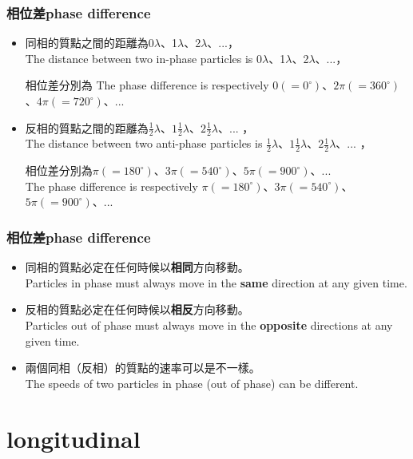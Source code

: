 \documentclass[beamer=true]{standalone}
\begin{document}
\begin{frame}
    \frametitle{相位差phase difference}
    \begin{itemize}
        \item 同相的質點之間的距離為0$\lambda$、1$\lambda$、2$\lambda$、...，\\The distance between two in-phase particles is  0$\lambda$、1$\lambda$、2$\lambda$、...，\par 相位差分別為 The phase difference is respectively $0(=0^\circ)$、$2\pi(=360^\circ)$、$4\pi(=720^\circ)$、...
        \item 反相的質點之間的距離為$\frac{1}{2}\lambda$、$1\frac{1}{2}\lambda$、$2\frac{1}{2}\lambda$、... ，\\The distance between two anti-phase particles is $\frac{1}{2}\lambda$、$1\frac{1}{2}\lambda$、$2\frac{1}{2}\lambda$、... ，\par 相位差分別為$\pi(=180^\circ)$、$3\pi(=540^\circ)$、$5\pi(=900^\circ)$、...\\The phase difference is respectively $\pi(=180^\circ)$、$3\pi(=540^\circ)$、$5\pi(=900^\circ)$、...
    \end{itemize}


\end{frame}
\begin{frame}
    \frametitle{相位差phase difference}
    \begin{itemize}
        \item 同相的質點必定在任何時候以\textbf{相同}方向移動。\\Particles in phase must always move in the \textbf{same} direction at any given time.
        \item 反相的質點必定在任何時候以\textbf{相反}方向移動。\\Particles out of phase must always move in the \textbf{opposite} directions at any given time.
        \item 兩個同相（反相）的質點的速率可以是不一樣。\\The speeds of two particles in phase (out of phase) can be different.


    \end{itemize}


\end{frame}



\section{longitudinal}
\end{document}
